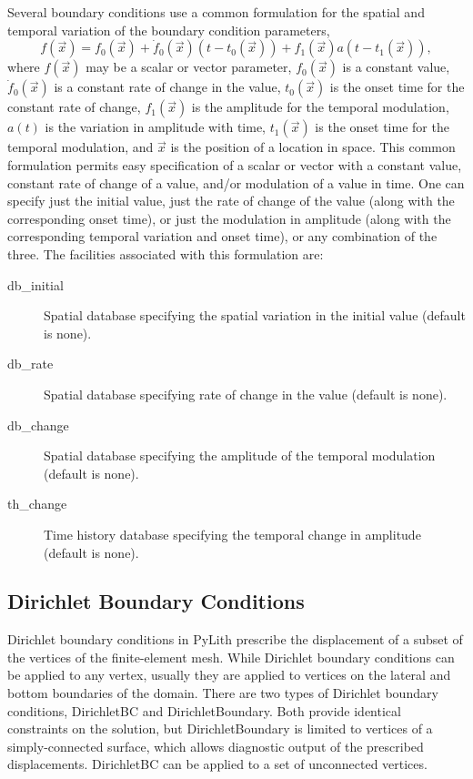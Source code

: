 Several boundary conditions use a common formulation for the spatial
and temporal variation of the boundary condition parameters,
\begin{equation}
f(\vec{x})=f_{0}(\vec{x})+\dot{f}_{0}(\vec{x})(t-t_{0}(\vec{x}))+f_{1}(\vec{x})a(t-t_{1}(\vec{x})),
\end{equation}
where $f(\vec{x})$ may be a scalar or vector parameter, $f_{0}(\vec{x})$
is a constant value, $\dot{f}_{0}(\vec{x})$ is a constant rate of
change in the value, $t_{0}(\vec{x})$ is the onset time for the constant
rate of change, $f_{1}(\vec{x})$ is the amplitude for the temporal
modulation, $a(t)$ is the variation in amplitude with time, $t_{1}(\vec{x})$
is the onset time for the temporal modulation, and $\vec{x}$ is the
position of a location in space. This common formulation permits easy
specification of a scalar or vector with a constant value, constant
rate of change of a value, and/or modulation of a value in time. One
can specify just the initial value, just the rate of change of the
value (along with the corresponding onset time), or just the modulation
in amplitude (along with the corresponding temporal variation and
onset time), or any combination of the three. The facilities associated
with this formulation are:
\begin{description}
\item [{db\_initial}] Spatial database specifying the spatial variation
in the initial value (default is none).
\item [{db\_rate}] Spatial database specifying rate of change in the value
(default is none).
\item [{db\_change}] Spatial database specifying the amplitude of the temporal
modulation (default is none).
\item [{th\_change}] Time history database specifying the temporal change
in amplitude (default is none).
\end{description}

\subsection{Dirichlet Boundary Conditions}

Dirichlet boundary conditions in PyLith prescribe the displacement
of a subset of the vertices of the finite-element mesh. While Dirichlet
boundary conditions can be applied to any vertex, usually they are
applied to vertices on the lateral and bottom boundaries of the domain.
There are two types of Dirichlet boundary conditions, DirichletBC
and DirichletBoundary. Both provide identical constraints on the solution,
but DirichletBoundary is limited to vertices of a simply-connected
surface, which allows diagnostic output of the prescribed displacements.
DirichletBC can be applied to a set of unconnected vertices.


